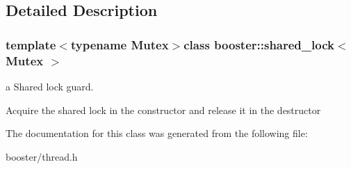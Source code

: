 \subsection{\-Detailed \-Description}
\subsubsection*{template$<$typename Mutex$>$class booster\-::shared\-\_\-lock$<$ Mutex $>$}

a \-Shared lock guard. 

\-Acquire the shared lock in the constructor and release it in the destructor 

\-The documentation for this class was generated from the following file\-:\begin{DoxyCompactItemize}
\item 
booster/thread.\-h\end{DoxyCompactItemize}
